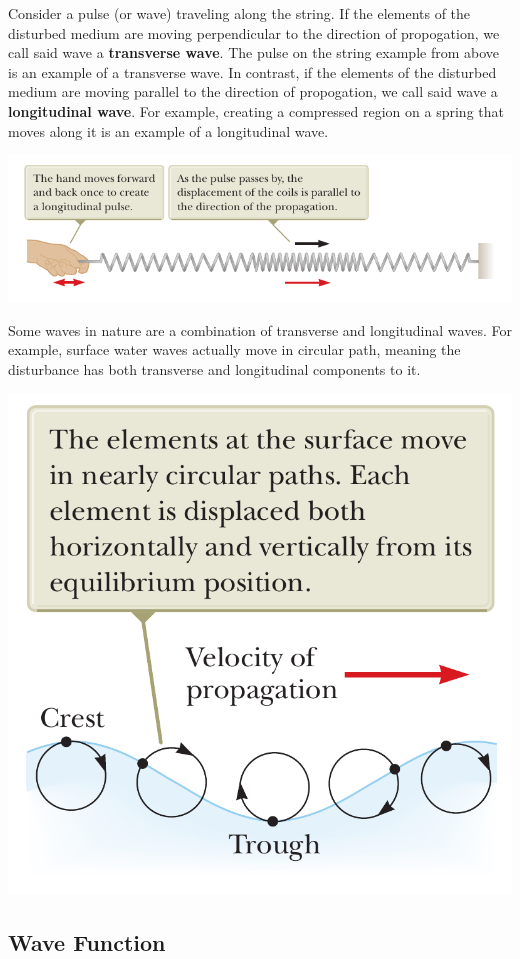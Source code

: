 Consider a pulse (or wave) traveling along the string. If the elements of the disturbed medium are
moving perpendicular to the direction of propogation, we call said wave a \textbf{transverse wave}.
The pulse on the string example from above is an example of a transverse wave.
In contrast, if the elements of the disturbed medium are moving parallel to the direction of propogation,
we call said wave a \textbf{longitudinal wave}. For example, creating a compressed region on a spring
that moves along it is an example of a longitudinal wave.
\begin{center}
    \includegraphics[scale=0.7]{images/oaw/pod02.png}
\end{center}

Some waves in nature are a combination of transverse and longitudinal waves. For example, surface 
water waves actually move in circular path, meaning the disturbance has both transverse and longitudinal
components to it.
\begin{center}
    \includegraphics[scale=0.25]{images/oaw/pod03.png}
\end{center}

\subsection{Wave Function}